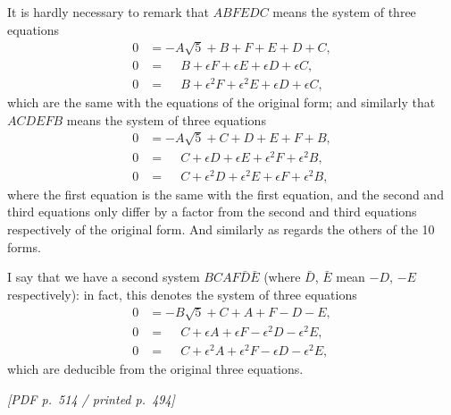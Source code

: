 \documentclass[11pt]{article}
\begin{document}
It is hardly necessary to remark that $ABFEDC$ means the system of three equations
\begin{align*}
0 &= -A\sqrt{5} + B + F + E + D + C, \\
0 &= \phantom{-}B + \epsilon F + \epsilon E + \epsilon D + \epsilon C, \\
0 &= \phantom{-}B + \epsilon^{2}F + \epsilon^{2}E + \epsilon D + \epsilon C,
\end{align*}
which are the same with the equations of the original form; and similarly that $ACDEFB$ means the system of three equations
\begin{align*}
0 &= -A\sqrt{5} + C + D + E + F + B, \\
0 &= \phantom{-}C + \epsilon D + \epsilon E + \epsilon^{2}F + \epsilon^{2}B, \\
0 &= \phantom{-}C + \epsilon^{2}D + \epsilon^{2}E + \epsilon F + \epsilon^{2}B,
\end{align*}
where the first equation is the same with the first equation, and the second and third equations only differ by a factor from the second and third equations respectively of the original form. And similarly as regards the others of the 10 forms.

I say that we have a second system $BCAF\bar{D}\bar{E}$ (where $\bar{D}$, $\bar{E}$ mean $-D$, $-E$ respectively): in fact, this denotes the system of three equations
\begin{align*}
0 &= -B\sqrt{5} + C + A + F - D - E, \\
0 &= \phantom{-}C + \epsilon A + \epsilon F - \epsilon^{2}D - \epsilon^{2}E, \\
0 &= \phantom{-}C + \epsilon^{2}A + \epsilon^{2}F - \epsilon D - \epsilon^{2}E,
\end{align*}
which are deducible from the original three equations.

\vfill
\noindent\textit{[PDF p.~514 / printed p.~494]}
\newpage
\end{document}

